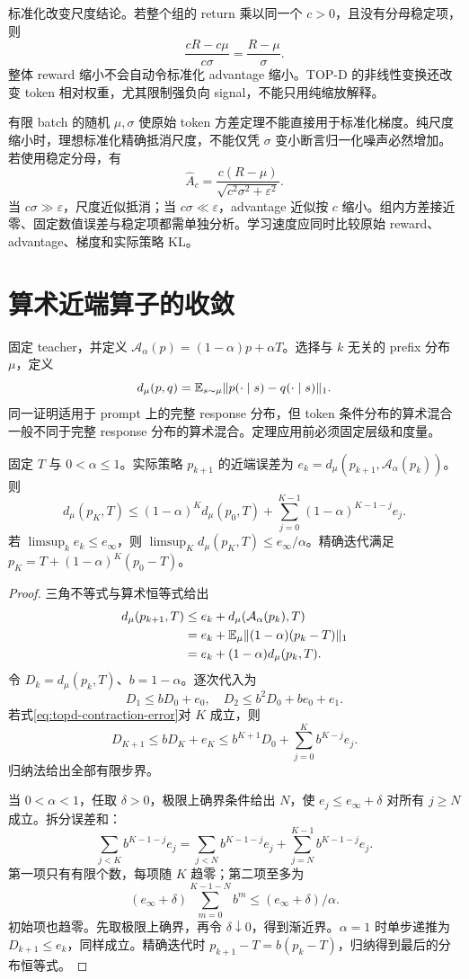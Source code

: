 标准化改变尺度结论。若整个组的 return 乘以同一个 $c>0$，且没有分母稳定项，则
\[
 \frac{cR-c\mu}{c\sigma}=\frac{R-\mu}{\sigma}.
\]
整体 reward 缩小不会自动令标准化 advantage 缩小。TOP-D 的非线性变换还改变 token 相对权重，尤其限制强负向 signal，不能只用纯缩放解释。

有限 batch 的随机 $\mu,\sigma$ 使原始 token 方差定理不能直接用于标准化梯度。纯尺度缩小时，理想标准化精确抵消尺度，不能仅凭 $\sigma$ 变小断言归一化噪声必然增加。若使用稳定分母，有
\[
 \widehat A_c=\frac{c(R-\mu)}{\sqrt{c^2\sigma^2+\varepsilon^2}}.
\]
当 $c\sigma\gg\varepsilon$，尺度近似抵消；当 $c\sigma\ll\varepsilon$，advantage 近似按 $c$ 缩小。组内方差接近零、固定数值误差与稳定项都需单独分析。学习速度应同时比较原始 reward、advantage、梯度和实际策略 KL。

\section{算术近端算子的收敛}

固定 teacher，并定义 $\mathcal A_\alpha(p)=(1-\alpha)p+\alpha T$。选择与 $k$ 无关的 prefix 分布 $\mu$，定义
\[
 d_\mu(p,q)=\mathbb{E}_{s\sim\mu}\|p(\cdot\mid s)-q(\cdot\mid s)\|_1.
\]
同一证明适用于 prompt 上的完整 response 分布，但 token 条件分布的算术混合一般不同于完整 response 分布的算术混合。定理应用前必须固定层级和度量。

\begin{theorem}
\label{thm:topd-contraction}
固定 $T$ 与 $0<\alpha\leq1$。实际策略 $p_{k+1}$ 的近端误差为 $e_k=d_\mu(p_{k+1},\mathcal A_\alpha(p_k))$。则
\begin{equation}
 d_\mu(p_K,T)\leq(1-\alpha)^Kd_\mu(p_0,T)
 +\sum_{j=0}^{K-1}(1-\alpha)^{K-1-j}e_j.
 \label{eq:topd-contraction-error}
\end{equation}
若 $\limsup_ke_k\leq e_\infty$，则 $\limsup_Kd_\mu(p_K,T)\leq e_\infty/\alpha$。精确迭代满足 $p_K=T+(1-\alpha)^K(p_0-T)$。
\end{theorem}
\begin{proof}
三角不等式与算术恒等式给出
\begin{align*}
 d_\mu(p_{k+1},T)&\leq e_k+d_\mu(\mathcal A_\alpha(p_k),T)\\
 &=e_k+\mathbb{E}_\mu\|(1-\alpha)(p_k-T)\|_1\\
 &=e_k+(1-\alpha)d_\mu(p_k,T).
\end{align*}
令 $D_k=d_\mu(p_k,T)$、$b=1-\alpha$。逐次代入为
\[
 D_1\leq bD_0+e_0,\quad D_2\leq b^2D_0+be_0+e_1.
\]
若式\eqref{eq:topd-contraction-error}对 $K$ 成立，则
\[
 D_{K+1}\leq bD_K+e_K\leq b^{K+1}D_0+\sum_{j=0}^Kb^{K-j}e_j.
\]
归纳法给出全部有限步界。

当 $0<\alpha<1$，任取 $\delta>0$，极限上确界条件给出 $N$，使 $e_j\leq e_\infty+\delta$ 对所有 $j\geq N$ 成立。拆分误差和：
\[
 \sum_{j<K}b^{K-1-j}e_j
 =\sum_{j<N}b^{K-1-j}e_j+\sum_{j=N}^{K-1}b^{K-1-j}e_j.
\]
第一项只有有限个数，每项随 $K$ 趋零；第二项至多为
\[
 (e_\infty+\delta)\sum_{m=0}^{K-1-N}b^m\leq(e_\infty+\delta)/\alpha.
\]
初始项也趋零。先取极限上确界，再令 $\delta\downarrow0$，得到渐近界。$\alpha=1$ 时单步递推为 $D_{k+1}\leq e_k$，同样成立。精确迭代时 $p_{k+1}-T=b(p_k-T)$，归纳得到最后的分布恒等式。
\end{proof}

